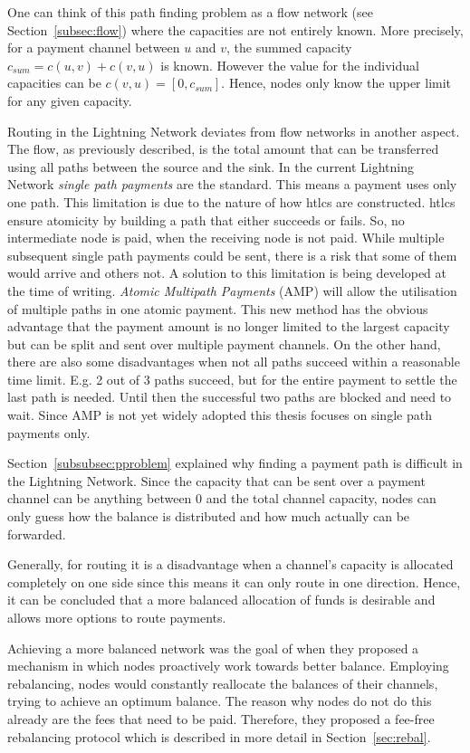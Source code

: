 \documentclass[final]{fhnwreport}       %
\begin{document}
One can think of this path finding problem as a flow network (see Section~\ref{subsec:flow}) where the capacities are not entirely known. More precisely, for a payment channel between $u$ and $v$, the summed capacity $c_{sum} = c(u,v) + c(v,u)$ is known. However the value for the individual capacities can be $c(v,u) = [0, c_{sum}]$. Hence, nodes only know the upper limit for any given capacity. 

Routing in the Lightning Network deviates from flow networks in another aspect. The flow, as previously described, is the total amount that can be transferred using all paths between the source and the sink. In the current Lightning Network \emph{single path payments} are the standard. This means a payment uses only one path. This limitation is due to the nature of how \glspl{htlc} are constructed. \glspl{htlc} ensure atomicity by building a path that either succeeds or fails. So, no intermediate node is paid, when the receiving node is not paid. While multiple subsequent single path payments could be sent, there is a risk that some of them would arrive and others not. A solution to this limitation is being developed at the time of writing. \emph{Atomic Multipath Payments} (AMP) will allow the utilisation of multiple paths in one atomic payment. This new method has the obvious advantage that the payment amount is no longer limited to the largest capacity but can be split and sent over multiple payment channels. On the other hand, there are also some disadvantages when not all paths succeed within a reasonable time limit. E.g. 2 out of 3 paths succeed, but for the entire payment to settle the last path is needed. Until then the successful two paths are blocked and need to wait. Since AMP is not yet widely adopted this thesis focuses on single path payments only.

Section~\ref{subsubsec:pproblem} explained why finding a payment path is difficult in the Lightning Network. Since the capacity that can be sent over a payment channel can be anything between 0 and the total channel capacity, nodes can only guess how the balance is distributed and how much actually can be forwarded. 

Generally, for routing it is a disadvantage when a channel's capacity is allocated completely on one side since this means it can only route in one direction. Hence, it can be concluded that a more balanced allocation of funds is desirable and allows more options to route payments.

Achieving a more balanced network was the goal of \textcite{pickhardt_imbalance_2019} when they proposed a mechanism in which nodes proactively work towards better balance. Employing rebalancing, nodes would constantly reallocate the balances of their channels, trying to achieve an optimum balance. The reason why nodes do not do this already are the fees that need to be paid. Therefore, they proposed a fee-free rebalancing protocol which is described in more detail in Section~\ref{sec:rebal}.
\end{document}
